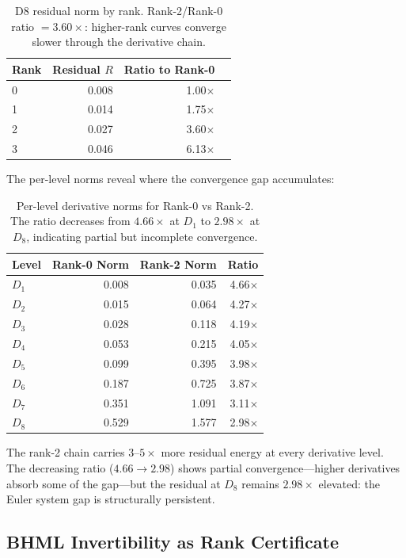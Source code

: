 \documentclass[11pt]{article}
\begin{document}
\begin{table}[h]
\centering
\begin{tabular}{l r r r}
\toprule
Rank & Residual $R$ & Ratio to Rank-0 \\
\midrule
0 & 0.008 & 1.00$\times$ \\
1 & 0.014 & 1.75$\times$ \\
2 & 0.027 & 3.60$\times$ \\
3 & 0.046 & 6.13$\times$ \\
\bottomrule
\end{tabular}
\caption{D8 residual norm by rank.  Rank-2/Rank-0 ratio $= 3.60\times$:
higher-rank curves converge slower through the derivative chain.}
\label{tab:d8-residual}
\end{table}

The per-level norms reveal where the convergence gap accumulates:

\begin{table}[h]
\centering
\begin{tabular}{l r r r}
\toprule
Level & Rank-0 Norm & Rank-2 Norm & Ratio \\
\midrule
$D_1$ & 0.008 & 0.035 & 4.66$\times$ \\
$D_2$ & 0.015 & 0.064 & 4.27$\times$ \\
$D_3$ & 0.028 & 0.118 & 4.19$\times$ \\
$D_4$ & 0.053 & 0.215 & 4.05$\times$ \\
$D_5$ & 0.099 & 0.395 & 3.98$\times$ \\
$D_6$ & 0.187 & 0.725 & 3.87$\times$ \\
$D_7$ & 0.351 & 1.091 & 3.11$\times$ \\
$D_8$ & 0.529 & 1.577 & 2.98$\times$ \\
\bottomrule
\end{tabular}
\caption{Per-level derivative norms for Rank-0 vs Rank-2.
The ratio decreases from $4.66\times$ at $D_1$ to $2.98\times$
at $D_8$, indicating partial but incomplete convergence.}
\label{tab:per-level-norms}
\end{table}

The rank-2 chain carries $3$--$5\times$ more residual energy at every
derivative level.  The decreasing ratio ($4.66 \to 2.98$) shows partial
convergence---higher derivatives absorb some of the gap---but the
residual at $D_8$ remains $2.98\times$ elevated: the Euler system
gap is structurally persistent.

\subsection{BHML Invertibility as Rank Certificate}
\label{ssec:bsd34-invertibility}
\end{document}

